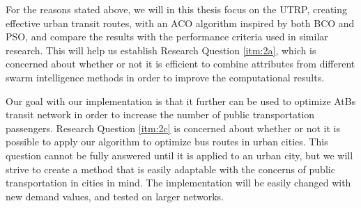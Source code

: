 For the reasons stated above, we will in this thesis focus on the UTRP, creating effective urban transit routes, with an ACO algorithm inspired by both BCO and PSO, and compare the results with the performance criteria used in similar research. This will help us establish Research Question \vref{itm:2a}, which is concerned about whether or not it is efficient to combine attributes from different swarm intelligence methods in order to improve the computational results.

Our goal with our implementation is that it further can be used to optimize AtBs transit network in order to increase the number of public transportation passengers. Research Question \vref{itm:2c} is concerned about whether or not it is possible to apply our algorithm to optimize bus routes in urban cities. This question cannot be fully answered until it is applied to an urban city, but we will strive to create a method that is easily adaptable with the concerns of public transportation in cities in mind. The implementation will be easily changed with new demand values, and tested on larger networks.


